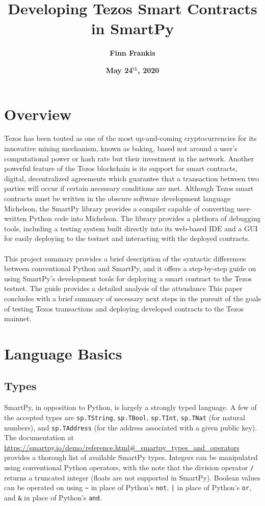 \documentclass{article}
\title{\textbf{Developing Tezos Smart Contracts in SmartPy}}
\author{\textbf{Finn Frankis}}
\date{\textbf{May 24$^\text{th}$, 2020}}
\begin{document}
    \maketitle
    \section{Overview}
   Tezos has been touted as one of the most up-and-coming cryptocurrencies for its innovative mining mechanism, known as baking, based not around a user's computational power or hash rate but their investment in the network. Another powerful feature of the Tezos blockchain is its support for smart contracts, digital, decentralized agreements which guarantee that a transaction between two parties will occur if certain necessary conditions are met. Although Tezos smart contracts must be written in the obscure software development language Michelson, the SmartPy library provides a compiler capable of converting user-written Python code into Michelson. The library provides a plethora of debugging tools, including a testing system built directly into its web-based IDE and a GUI for easily deploying to the testnet and interacting with the deployed contracts. \\~\\
   This project summary provides a brief description of the syntactic differences between conventional Python and SmartPy, and it offers a step-by-step guide on using SmartPy's development tools for deploying a smart contract to the Tezos testnet. The guide provides a detailed analysis of the attendance This paper concludes with a brief summary of necessary next steps in the pursuit of the goals of testing Tezos transactions and deploying developed contracts to the Tezos mainnet. 
\section{Language Basics}
\subsection{Types}
SmartPy, in opposition to Python, is largely a strongly typed language. A few of the accepted types are \lstinline!sp.TString!, \lstinline!sp.TBool!, \lstinline!sp.TInt!, \lstinline!sp.TNat! (for natural numbers), and \lstinline!sp.TAddress! (for the address associated with a given public key). The documentation at \url{https://smartpy.io/demo/reference.html#_smartpy_types_and_operators} provides a thorough list of available SmartPy types. Integers can be manipulated using conventional Python operators, with the note that the division operator \lstinline!/! returns a truncated integer (floats are not supported in SmartPy). Boolean values can be operated on using \lstinline!~! in place of Python's \lstinline!not!, \lstinline!|! in place of Python's \lstinline!or!, and \lstinline!&! in place of Python's \lstinline!and!.
\end{document}
